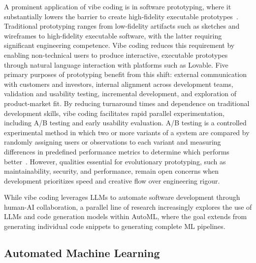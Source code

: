 \documentclass[
english,                 %
bibtex,                  %
includeExtraAbstracts, %
]{kththesis}
\numberwithin{listing}{chapter}
\begin{document}
A prominent application of vibe coding is in software prototyping, where it substantially lowers the barrier to create high-fidelity executable prototypes~\cite{borg_vibe_2025}. Traditional prototyping ranges from low-fidelity artifacts such as sketches and wireframes to high-fidelity executable software, with the latter requiring significant engineering competence. Vibe coding reduces this requirement by enabling non-technical users to produce interactive, executable prototypes through natural language interaction with platforms such as Lovable. Five primary purposes of prototyping benefit from this shift: external communication with customers and investors, internal alignment across development teams, validation and usability testing, incremental development, and exploration of product-market fit. By reducing turnaround times and dependence on traditional development skills, vibe coding facilitates rapid parallel experimentation, including A/B testing and early usability evaluation. A/B testing is a controlled experimental method in which two or more variants of a system are compared by randomly assigning users or observations to each variant and measuring differences in predefined performance metrics to determine which performs better~\cite{shahriari_taking_2016}. However, qualities essential for evolutionary prototyping, such as maintainability, security, and performance, remain open concerns when development prioritizes speed and creative flow over engineering rigour.

While vibe coding leverages \glspl{LLM} to automate software development through human-\gls{AI} collaboration, a parallel line of research increasingly explores the use of \glspl{LLM} and code generation models within \gls{AutoML}, where the goal extends from generating individual code snippets to generating complete \gls{ML} pipelines.

\subsection{Automated Machine Learning}
\end{document}
